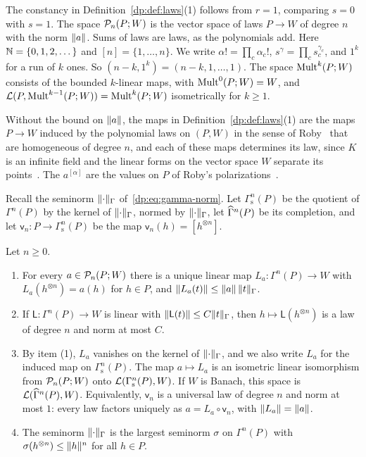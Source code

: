 The constancy in Definition~\ref{dp:def:laws}(1) follows from $r=1$, comparing $s=0$ with $s=1$. The space $\mathcal P_n(P;W)$ is the vector space of laws $P\to W$ of degree $n$ with the norm $\lVert a\rVert$. Sums of laws are laws, as the polynomials add. Here $\mathbb N=\{0,1,2,\dots\}$ and $[n]=\{1,\dots,n\}$. We write $\alpha!=\prod_c\alpha_c!$, $s^\gamma=\prod_cs_c^{\gamma_c}$, and $1^k$ for a run of $k$ ones. So $(n-k,1^k)=(n-k,1,\dots,1)$. The space $\operatorname{Mult}^k(P;W)$ consists of the bounded $k$\nobreakdash-linear maps, with $\operatorname{Mult}^0(P;W)=W$, and $\mathcal L(P,\operatorname{Mult}^{k-1}(P;W))=\operatorname{Mult}^k(P;W)$ isometrically for $k\ge1$.

Without the bound on $\lVert a\rVert$, the maps in Definition~\ref{dp:def:laws}(1) are the maps $P\to W$ induced by the polynomial laws on $(P,W)$ in the sense of Roby~\cite{Ro} that are homogeneous of degree $n$, and each of these maps determines its law, since $K$ is an infinite field and the linear forms on the vector space $W$ separate its points~\cite[Th.~I.1, Props.~I.1, I.8, IV.6, IV.7]{Ro}. The $a^{[\alpha]}$ are the values on $P$ of Roby's polarizations~\cite[II~\S1]{Ro}.

Recall the seminorm $\lVert \cdot\rVert_\Gamma$ of~\eqref{dp:eq:gamma-norm}. Let $\Gamma^n_{\mathrm s}(P)$ be the quotient of $\Gamma^n(P)$ by the kernel of $\lVert \cdot\rVert_\Gamma$, normed by $\lVert \cdot\rVert_\Gamma$, let $\widehat\Gamma^n(P)$ be its completion, and let $\mathsf v_n\colon P\to\Gamma^n_{\mathrm s}(P)$ be the map $\mathsf v_n(h)=[h^{\otimes n}]$.

\begin{theorem}\label{dp:thm:normed-roby}
Let $n\ge0$.
\begin{enumerate}
\item For every $a\in\mathcal P_n(P;W)$ there is a unique linear map $L_a\colon\Gamma^n(P)\to W$ with $L_a(h^{\otimes n})=a(h)$ for $h\in P$, and $\lVert L_a(t)\rVert\le\lVert a\rVert\,\lVert t\rVert_\Gamma$.
\item If $\mathsf L\colon\Gamma^n(P)\to W$ is linear with $\lVert \mathsf L(t)\rVert\le C\lVert t\rVert_\Gamma$, then $h\mapsto\mathsf L(h^{\otimes n})$ is a law of degree $n$ and norm at most $C$.
\item By item (1), $L_a$ vanishes on the kernel of $\lVert \cdot\rVert_\Gamma$, and we also write $L_a$ for the induced map on $\Gamma^n_{\mathrm s}(P)$. The map $a\mapsto L_a$ is an isometric linear isomorphism from $\mathcal P_n(P;W)$ onto $\mathcal L(\Gamma^n_{\mathrm s}(P),W)$. If $W$ is Banach, this space is $\mathcal L(\widehat\Gamma^n(P),W)$. Equivalently, $\mathsf v_n$ is a universal law of degree $n$ and norm at most $1$: every law factors uniquely as $a=L_a\circ\mathsf v_n$, with $\lVert L_a\rVert=\lVert a\rVert$.
\item The seminorm $\lVert \cdot\rVert_\Gamma$ is the largest seminorm $\sigma$ on $\Gamma^n(P)$ with $\sigma(h^{\otimes n})\le\lVert h\rVert^n$ for all $h\in P$.
\end{enumerate}
\end{theorem}

